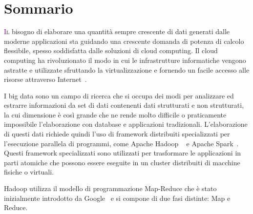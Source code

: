 \newcommand{\sommarioname}{Sommario}
\addcontentsline{toc}{chapter}{\sommarioname}

\begingroup
\let\clearpage\relax
\let\cleardoublepage\relax
\let\cleardoublepage\relax

\chapter*{Sommario}
\lettrine[lines=4]{\textcolor{purple}{I}}{l} bisogno di elaborare una quantità sempre crescente di dati generati dalle moderne applicazioni sta guidando una crescente domanda di potenza di calcolo flessibile, spesso soddisfatta dalle soluzioni di cloud computing. Il cloud computing ha rivoluzionato il modo in cui le infrastrutture informatiche vengono astratte e utilizzate sfruttando la virtualizzazione e fornendo un facile accesso alle risorse attraverso Internet~\cite{articleBigData:2017}.


I big data sono un campo di ricerca che si occupa dei modi per analizzare ed estrarre informazioni da set di dati contenenti dati strutturati e non strutturati, la cui dimensione è così grande che ne rende molto difficile o praticamente impossibile l'elaborazione con database e applicazioni tradizionali. L'elaborazione di questi dati richiede quindi l'uso di framework distribuiti specializzati per l'esecuzione parallela di programmi, come Apache Hadoop ~\cite{misc:ApacheHadoop} e Apache Spark~\cite{misc:ApacheSpark}. Questi framework specializzati sono utilizzati per trasformare le applicazioni in parti atomiche che possono essere eseguite in un cluster distribuiti di macchine fisiche o virtuali.


Hadoop utilizza il modello di programmazione Map-Reduce che è stato inizialmente introdotto da Google~\cite{misc:GoogleMapReduce} e si compone di due fasi distinte: Map e Reduce.


